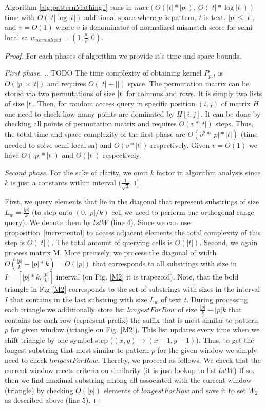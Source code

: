 \begin{theorem}
Algorithm \ref{alg:patternMathing1} runs in $max(O(|t|*|p|),\ O(|t| * \log |t|))$ time with $O( |t| \log |t|)$ additional space where $p$ is pattern, $t$ is text, $|p| \leq |t|$, and $v=O(1)$ where $v$ is denominator of normalized mismatch score for semi-local sa $w_{normalized} = (1,\frac{\mu}{v},0)$.
\end{theorem}
\begin{proof}
  For each phases of algorithm we provide it's time and space bounds.
  
\emph{First phase.}
.. TODO
The time complexity of obtaining kernel $P_{p,t}$ is $O(|p|\times |t|)$ and requires $O(|t|+||)$ space.
The permutation matrix can be stored via two permutations of size $|t|$ for columns and rows.
It is simply two lists of size $|t|$.
Then, for random access query in specific position $(i,j)$ of matrix $H$ one need to check how many points are dominated by $H [i,j]$.
It can be done by checking all points of permutation matrix and requires $O(v * |t|)$ steps.
Thus, the total time and space complexity of the first phase are $O(v^2 *|p| * |t|)$ (time needed to solve semi-local sa) and $O(v*|t|)$ respectively.
Given $v=O(1)$ we have $O(|p| * |t|)$ and $O(|t|)$ respectively.

\emph{Second phase}.
For the sake of clarity, we omit $k$ factor in algorithm analysis since $k$ is just a constants within interval $(\frac{1}{\sqrt{3}},1]$.

First, we query elements that lie in the diagonal that represent
substrings of size $L_{w}=\frac{|p|}{k}$ (to step onto $(0,|p|/k)$ cell we need to perform one orthogonal range query).
We denote them by $lstW$ (line 4).
Since we can use proposition~\ref{incremental} to access
adjacent elements 
the total complexity of this step is $O(|t|)$.
The total amount of querying cells is $O(|t|)$. 
Second, we again process matrix M.
More precisely, we process the diagonal of width $O(\frac{|p|}{k}-|p|*k)=O(|p|)$ that corresponds to all substrings with size in  $I=[|p|*k, \frac{|p|}{k}]$ interval (on Fig. \ref{M2} it is  trapezoid).
Note, that the bold triangle in Fig  \ref{M2} corresponds to the set of substrings with sizes in the interval $I$ that contains in the last substring with size $L_{w}$ of text $t$.
During processing each triangle we  additionally store list $longestForRow$ of size $\frac{|p|}{k}-|p|k$ that contains
for each row (represent prefix) the suffix that is most similar to pattern $p$ for given window (triangle on Fig. \ref{M2}).
This list updates every time when we shift triangle by one symbol step ($(x,y)\rightarrow (x-1,y-1)$).
Thus, to get the longest substring that most similar to pattern $p$ for the given window we simply need to check $longestForRow$. 
Thereby, we proceed as follows.
We check that the current window meets criteria
on similarity (it is just lookup to list $lstW$)
If so, then we find maximal substring among all associated with the current window (triangle) by checking $O(|p|)$ elements of $longestForRow$ and save it to set $W_{2}$ as described above (line 5).


\end{proof}
